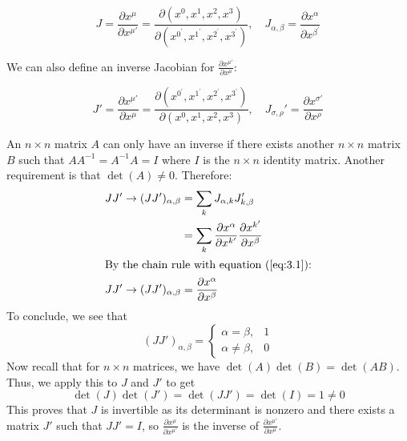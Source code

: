 \documentclass{article}
\begin{document}
	$$ J =  \frac{\partial x^\mu}{\partial x^{\mu'}} = \frac{\partial (x^0, x^1, x^2, x^3)}{\partial (x^{0^\prime} , x^{1^\prime} , x^{2^\prime},  x^{3^\prime} ) }, \quad J_{\alpha, \beta} = \frac{\partial x^\alpha}{\partial x^{\beta^\prime}}$$
	
	We can also define an inverse Jacobian for $\frac{\partial x^{\mu'}}{\partial x^{\mu}}$:
	
	$$ J' =  \frac{\partial x^{\mu'}}{\partial x^{\mu}} = \frac{\partial(x^{0^\prime} , x^{1^\prime} , x^{2^\prime},  x^{3^\prime} )}{\partial (x^0, x^1, x^2, x^3) }, \quad J_{\sigma, \rho}' = \frac{\partial x^{\sigma'}}{\partial x^{\rho}}$$
	
	An $n \times n$ matrix $A$ can only have an inverse if there exists another $n \times n$ matrix $B$ such that $AA^{-1} = A^{-1}A = I$ where $I$ is the $n\times n$ identity matrix. Another requirement is that $\det(A)\neq0$. Therefore:
	\begin{align*}
		JJ' \to (JJ')_{\alpha, \beta} &= \sum_{k} J_{\alpha, k} J_{k, \beta}' \\
		&= \sum_k \frac{\partial x^\alpha}{\partial x^{k'}} \frac{\partial x^{k'}}{\partial x^\beta} \\
		\intertext{By the chain rule with equation (\ref{eq:3.1}):}
		JJ' \to (JJ')_{\alpha, \beta}&= \frac{\partial x^\alpha}{\partial x^\beta}
	\end{align*}
	To conclude, we see that
	$$ (JJ')_{\alpha, \beta} = \begin{cases}
		\alpha = \beta, & 1\\
		\alpha \neq \beta, & 0
	\end{cases}$$
	Now recall that for $n \times n$ matrices, we have $\det(A)\det(B) = \det(AB)$. Thus, we apply this to $J$ and $J'$ to get
	$$ \det(J)\det(J')=\det(JJ')=\det(I)=1\neq0$$
	This proves that $J$ is invertible as its determinant is nonzero and there exists a matrix $J'$ such that $JJ'=I$, so $\frac{\partial x^\mu}{\partial x^{\mu '}}$ is the inverse of $\frac{\partial x^{\mu'}}{\partial x^\mu}$.
\end{document}
